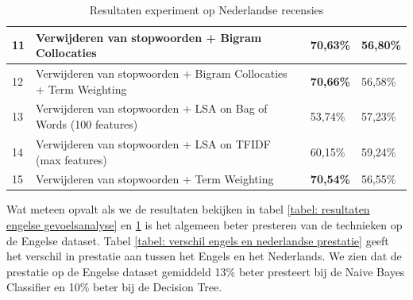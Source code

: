 \begin{table}[h]
\begin{adjustbox}{width=1\textwidth}
\begin{tabular}{|l|l|l|l|}
11       & Verwijderen van stopwoorden + Bigram Collocaties                                     & {\bf 70,63\%}                           & 56,80\%                        \\ \hline
12       & Verwijderen van stopwoorden + Bigram Collocaties + Term Weighting                    & {\bf 70,66\%}                           & 56,58\%                        \\ \hline
13       & Verwijderen van stopwoorden + LSA on Bag of Words (100 features)                     & 53,74\%                                 & 57,23\%                        \\ \hline
14       & Verwijderen van stopwoorden + LSA on TFIDF (max features)                            & 60,15\%                                 & 59,24\%                        \\ \hline
15       & Verwijderen van stopwoorden + Term Weighting                                         & {\bf 70,54\%}                           & 56,55\%                        \\ \hline
\end{tabular}
\end{adjustbox}

\caption{Resultaten experiment op Nederlandse recensies}
\label{tabel: resultaten Nederlandse gevoelsanalyse}
\end{table}


Wat meteen opvalt als we de resultaten bekijken in tabel \ref{tabel: resultaten engelse gevoelsanalyse} en \ref{tabel: resultaten Nederlandse gevoelsanalyse} is het algemeen beter presteren van de technieken op de Engelse dataset. Tabel \ref{tabel: verschil engels en nederlandse prestatie} geeft het verschil in prestatie aan tussen het Engels en het Nederlands. We zien dat de prestatie op de Engelse dataset gemiddeld 13\% beter presteert bij de Naive Bayes Classifier en 10\% beter bij de Decision Tree.


